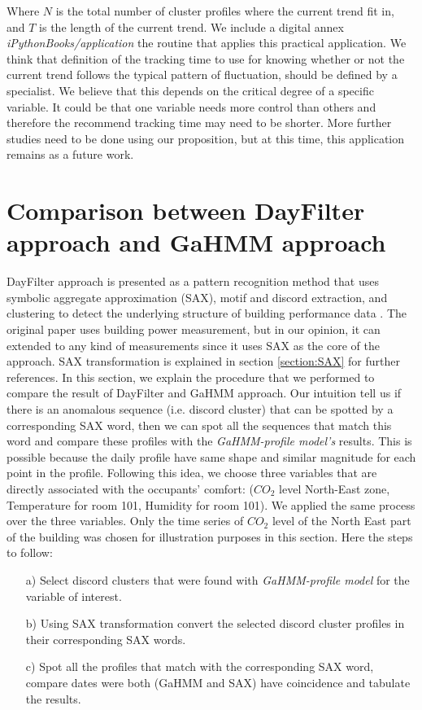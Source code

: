 Where $N$ is the total number of cluster profiles where the current trend fit in, and $T$ is the length of the current trend. We include a digital annex \textit{iPythonBooks/application} the routine that applies this practical application. We think that definition of the tracking time to use for knowing whether or not the current trend follows the typical pattern of fluctuation, should be defined by a specialist. We believe that this depends on the critical degree of a specific variable. It could be that one variable needs more control than others and therefore the recommend tracking time may need to be shorter. More further studies need to be done using our proposition, but at this time, this application remains as a future work.   
     

\section{Comparison between DayFilter approach and GaHMM approach}
\label{comparison_sax_hmm}
DayFilter approach is presented as a pattern recognition method that uses symbolic aggregate approximation (SAX), motif and discord extraction, and clustering to detect the underlying structure of building performance data \cite{kim2017review}. The original paper \cite{miller2015automated} uses building power measurement, but in our opinion, it can extended to any kind of measurements since it uses SAX as the core of the approach. SAX transformation is explained in section \ref{section:SAX} for further references. In this section, we explain the procedure that we performed to compare the result of DayFilter and GaHMM approach. Our intuition tell us if there is an anomalous sequence (i.e. discord cluster) that can be spotted by a corresponding SAX word, then we can spot all the sequences that match this word and compare these profiles with the \textit{GaHMM-profile model's} results. This is possible because the daily profile have same shape and similar magnitude for each point in the profile. Following this idea, we choose three variables that are directly associated with the occupants' comfort: ($CO_2$ level North-East zone, Temperature for room 101, Humidity for room 101). We applied the same process over the three variables. Only the time series of $CO_2$ level of the North East part of the building was chosen for illustration purposes in this section. Here the steps to follow:

\begin{itemize}
    	\item[a)] Select discord clusters that were found with \textit{GaHMM-profile model} for the variable of interest.
    	\item[b)] Using SAX transformation convert the selected discord cluster profiles in their corresponding SAX words.
    	\item[c)] Spot all the profiles that match with the corresponding SAX word, compare dates were both (GaHMM and SAX) have coincidence and tabulate the results.
    \end{itemize}
 
